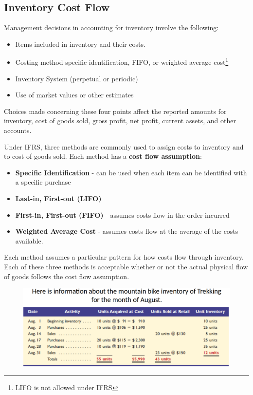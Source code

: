 \documentclass[../main.tex]{subfiles}
\begin{document}
	\subsection{Inventory Cost Flow}
	
	Management decisions in accounting for inventory involve the following:
	\begin{itemize}[noitemsep]
		\item Items included in inventory and their costs.
		\item Costing method \eg specific identification, FIFO, or weighted 
		average cost\footnote{LIFO is not allowed under IFRS}
		\item Inventory System (perpetual or periodic)
		\item Use of market values or other estimates
	\end{itemize}
	
	Choices made concerning these four points affect the reported amounts for 
	inventory, cost of goods sold, gross profit, net profit, current assets, 
	and other accounts.  
	
	Under IFRS, three methods are commonly used to assign costs to inventory 
	and to cost of goods sold. Each method has a \textbf{cost flow assumption}:
	\begin{itemize}[noitemsep]
		\item \textbf{Specific Identification} - can be used when each item can 
		be identified with a specific purchase
		\item \textbf{Last-in, First-out (LIFO)} 
		\item \textbf{First-in, First-out (FIFO)} - assumes costs flow in the 
		order incurred
		\item \textbf{Weighted Average Cost} - assumes costs flow at the 
		average of the costs available.
	\end{itemize}
	Each method assumes a particular pattern for how costs flow through 
	inventory. Each of these three methods is acceptable whether or not the 
	actual physical flow of goods follows the cost flow assumption. 
	
	\begin{figure}[ht]
		\centering
		\includegraphics[width=\columnwidth]{images/c7/inventory_costing_eg.png}
	\end{figure}
	
\end{document}
